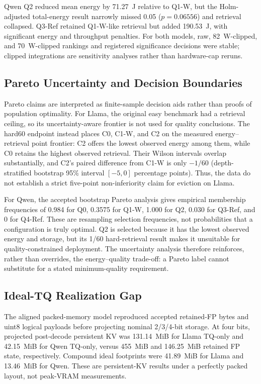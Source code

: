 \documentclass[conference]{IEEEtran}
\begin{document}
Qwen Q2 reduced mean energy by 71.27~J relative to Q1-W, but the Holm-adjusted total-energy result narrowly missed 0.05 ($p=0.06556$) and retrieval collapsed. Q3-Ref retained Q1-W-like retrieval but added 190.53~J, with significant energy and throughput penalties. For both models, raw, 82~W-clipped, and 70~W-clipped rankings and registered significance decisions were stable; clipped integrations are sensitivity analyses rather than hardware-cap reruns.

\subsection{Pareto Uncertainty and Decision Boundaries}

Pareto claims are interpreted as finite-sample decision aids rather than proofs of population optimality. For Llama, the original easy benchmark had a retrieval ceiling, so its uncertainty-aware frontier is not used for quality conclusions. The hard60 endpoint instead places C0, C1-W, and C2 on the measured energy--retrieval point frontier: C2 offers the lowest observed energy among them, while C0 retains the highest observed retrieval. Their Wilson intervals overlap substantially, and C2's paired difference from C1-W is only $-1/60$ (depth-stratified bootstrap 95\% interval $[-5,0]$ percentage points). Thus, the data do not establish a strict five-point non-inferiority claim for eviction on Llama.

For Qwen, the accepted bootstrap Pareto analysis gives empirical membership frequencies of 0.984 for Q0, 0.3575 for Q1-W, 1.000 for Q2, 0.030 for Q3-Ref, and 0 for Q4-Ref. These are resampling selection frequencies, not probabilities that a configuration is truly optimal. Q2 is selected because it has the lowest observed energy and storage, but its 1/60 hard-retrieval result makes it unsuitable for quality-constrained deployment. The uncertainty analysis therefore reinforces, rather than overrides, the energy--quality trade-off: a Pareto label cannot substitute for a stated minimum-quality requirement.

\subsection{Ideal-TQ Realization Gap}

The aligned packed-memory model reproduced accepted retained-FP bytes and uint8 logical payloads before projecting nominal 2/3/4-bit storage. At four bits, projected post-decode persistent KV was 131.14~MiB for Llama TQ-only and 42.15~MiB for Qwen TQ-only, versus 455~MiB and 146.25~MiB retained FP state, respectively. Compound ideal footprints were 41.89~MiB for Llama and 13.46~MiB for Qwen. These are persistent-KV results under a perfectly packed layout, not peak-VRAM measurements.
\end{document}
